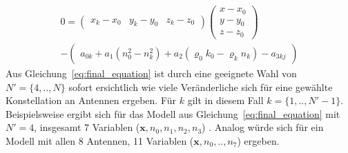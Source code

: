 {%
\begin{multline}\label{eq:final_equation}
0=
\left(
	\begin{array}{ccc}
		x_k-x_0 & y_k-y_0 & z_k-z_0 
	\end{array}
\right)
\left(
   \begin{array}{c}
	   x-x_0\\
	   y-y_0\\
	   z-z_0
   \end{array}
\right) \\
-
\left(
	\begin{array}{c}
		a_{0k}+a_1(n_0^2-n_k^2)+a_2(\varrho_0k_0-\varrho_kn_k)-a_{3kj}
	\end{array}
	\right)
\end{multline}
%
Aus Gleichung~\eqref{eq:final_equation} ist durch eine geeignete Wahl von $N'=\{4,..,N\}$ sofort ersichtlich wie viele Veränderliche sich für eine gewählte Konstellation an Antennen ergeben. Für $k$ gilt in diesem Fall $k=\{1,..,N'-1\}$.\\
%
Beispielsweise ergibt sich für das Modell aus Gleichung~\eqref{eq:final_equation} mit $N'=4$, insgesamt 7 Variablen ($\mathbf{x},n_0,n_1,n_2,n_3$) . Analog würde sich für ein Modell mit allen 8 Antennen, 11 Variablen ($\mathbf{x},n_0,..,n_7$) ergeben.
}